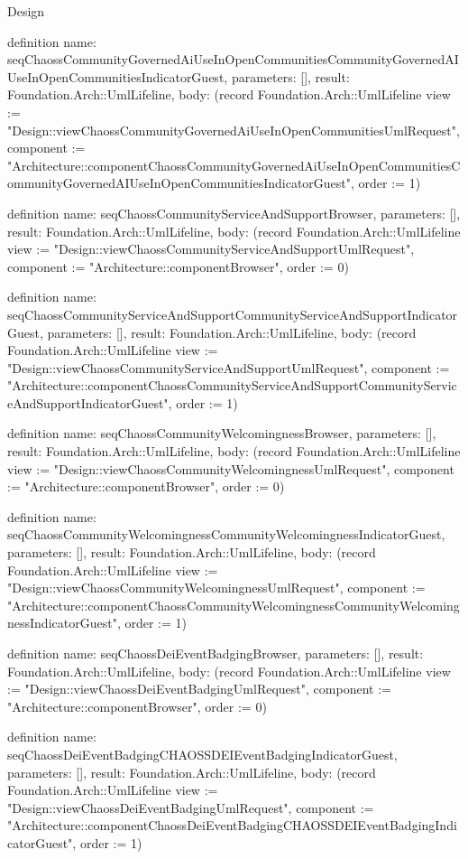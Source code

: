 \begin{lexlean}{Design}
\begin{semanticmodule}
definition{
  name: seqChaossCommunityGovernedAiUseInOpenCommunitiesCommunityGovernedAIUseInOpenCommunitiesIndicatorGuest,
  parameters: [],
  result: Foundation.Arch::UmlLifeline,
  body: (record Foundation.Arch::UmlLifeline {view := "Design::viewChaossCommunityGovernedAiUseInOpenCommunitiesUmlRequest", component := "Architecture::componentChaossCommunityGovernedAiUseInOpenCommunitiesCommunityGovernedAIUseInOpenCommunitiesIndicatorGuest", order := 1})
}

definition{
  name: seqChaossCommunityServiceAndSupportBrowser,
  parameters: [],
  result: Foundation.Arch::UmlLifeline,
  body: (record Foundation.Arch::UmlLifeline {view := "Design::viewChaossCommunityServiceAndSupportUmlRequest", component := "Architecture::componentBrowser", order := 0})
}

definition{
  name: seqChaossCommunityServiceAndSupportCommunityServiceAndSupportIndicatorGuest,
  parameters: [],
  result: Foundation.Arch::UmlLifeline,
  body: (record Foundation.Arch::UmlLifeline {view := "Design::viewChaossCommunityServiceAndSupportUmlRequest", component := "Architecture::componentChaossCommunityServiceAndSupportCommunityServiceAndSupportIndicatorGuest", order := 1})
}

definition{
  name: seqChaossCommunityWelcomingnessBrowser,
  parameters: [],
  result: Foundation.Arch::UmlLifeline,
  body: (record Foundation.Arch::UmlLifeline {view := "Design::viewChaossCommunityWelcomingnessUmlRequest", component := "Architecture::componentBrowser", order := 0})
}

definition{
  name: seqChaossCommunityWelcomingnessCommunityWelcomingnessIndicatorGuest,
  parameters: [],
  result: Foundation.Arch::UmlLifeline,
  body: (record Foundation.Arch::UmlLifeline {view := "Design::viewChaossCommunityWelcomingnessUmlRequest", component := "Architecture::componentChaossCommunityWelcomingnessCommunityWelcomingnessIndicatorGuest", order := 1})
}

definition{
  name: seqChaossDeiEventBadgingBrowser,
  parameters: [],
  result: Foundation.Arch::UmlLifeline,
  body: (record Foundation.Arch::UmlLifeline {view := "Design::viewChaossDeiEventBadgingUmlRequest", component := "Architecture::componentBrowser", order := 0})
}

definition{
  name: seqChaossDeiEventBadgingCHAOSSDEIEventBadgingIndicatorGuest,
  parameters: [],
  result: Foundation.Arch::UmlLifeline,
  body: (record Foundation.Arch::UmlLifeline {view := "Design::viewChaossDeiEventBadgingUmlRequest", component := "Architecture::componentChaossDeiEventBadgingCHAOSSDEIEventBadgingIndicatorGuest", order := 1})
}


\end{semanticmodule}
\end{lexlean}
